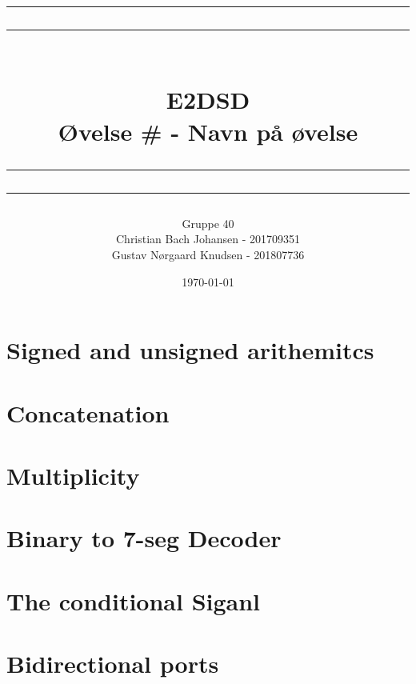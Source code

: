 \documentclass[12pt,a4paper]{article}
\newcommand\mymaketitle[1]{
   \rule{\textwidth}{1.6pt}\vspace*{-\baselineskip}\vspace*{2pt}
   \rule{\textwidth}{0.4pt}
   \\  
   \huge \bf #1\\
   \vspace{-8pt}
   \rule{\textwidth}{0.4pt}\vspace*{-\baselineskip}\vspace{3.2pt}
   \rule{\textwidth}{1.6pt}
}
\begin{document}
\title{
	\mymaketitle{E2DSD\\Øvelse \# - Navn på øvelse}
}
\author{
	Gruppe 40\\
	Christian Bach Johansen - 201709351\\
	Gustav Nørgaard Knudsen - 201807736
}
\date{\today}

\maketitle


\section{Signed and unsigned arithemitcs}

\newpage

\section{Concatenation}


\section{Multiplicity}


\section{Binary to 7-seg Decoder}


\section{The conditional Siganl}


\section{Bidirectional ports}

\end{document}
